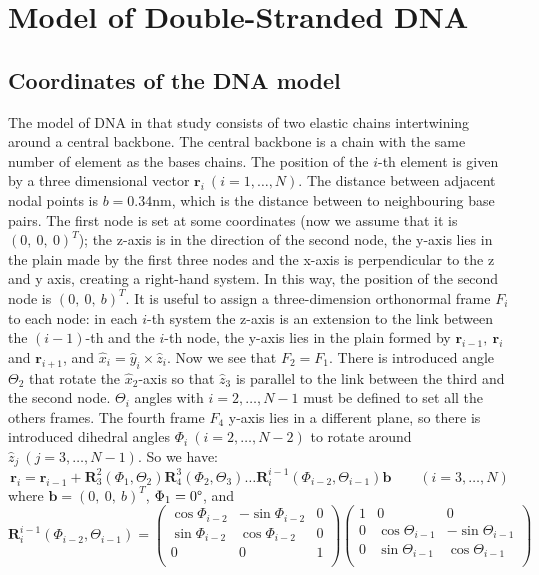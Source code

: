 \documentclass[a4paper,10pt]{article}
\begin{document}
\section{Model of Double-Stranded DNA}
\subsection{Coordinates of the DNA model}
The model of DNA in that study consists of two elastic chains intertwining around a central backbone.
The central backbone is a chain with the same number of element as the bases chains.
The position of the $i$-th element is given by a three dimensional vector $\textbf{r}_i \ \left(i=1,\dots ,N\right)$.
The distance between adjacent nodal points is $b = 0.34$\si{\nm}, which is the distance between to neighbouring base pairs.
The first node is set at some coordinates (now we assume that it is $(0,\ 0,\ 0)^T$);
the z-axis is in the direction of the second node, the y-axis lies in the plain made by the first three nodes and the x-axis is perpendicular to the z and y axis, creating a right-hand system.
In this way, the position of the second node is $(0,\ 0,\ b)^T$.
It is useful to assign a three-dimension orthonormal frame $F_i$ to each node: in each $i$-th system the z-axis is an extension to the link between the $\left (i-1\right )$-th and the $i$-th node, the y-axis lies in the plain formed by $\textbf{r}_{i-1},\ \textbf{r}_i$ and $\textbf{r}_{i+1}$, and $\hat{x}_i=\hat{y}_i\times\hat{z}_i$.
Now we see that $F_2=F_1$.
There is introduced angle $\Theta_2$ that rotate the $\hat{x}_2$-axis so that $\hat{z}_3$ is parallel to the link between the third and the second node.
$\Theta_i$ angles with $i=2,\dots,N-1$ must be defined to set all the others frames.
The fourth frame $F_4$ y-axis lies in a different plane, so there is  introduced dihedral angles $\Phi_i\ (i=2,\dots,N-2)$ to rotate around $\hat{z}_j\ (j=3,\dots,N-1)$.
So we have:
\begin{equation}\label{eq:c_coo}
\textbf{r}_i=\textbf{r}_{i-1}+\textbf{R}^{2}_{3}\left(\Phi_1,\Theta_2\right)\textbf{R}^{3}_{4}\left(\Phi_2,\Theta_3\right)\dots\textbf{R}^{i-1}_{i}\left(\Phi_{i-2},\Theta_{i-1}\right)\textbf{b}\qquad (i=3,\dots,N)
\end{equation}
where $\textbf{b}=(0,\ 0,\ b)^T$, $\Phi_1=0\degree$, and
\begin{equation}\label{eq:r_matrix}
\textbf{R}^{i-1}_{i}\left(\Phi_{i-2},\Theta_{i-1}\right)=
\begin{pmatrix}
\cos\Phi_{i-2} & -\sin\Phi_{i-2} & 0 \\
\sin\Phi_{i-2} & \cos\Phi_{i-2} & 0 \\
0 & 0 & 1 \\
\end{pmatrix}
\begin{pmatrix}
1 & 0 & 0 \\
0 & \cos\Theta_{i-1} & -\sin\Theta_{i-1} \\
0 & \sin\Theta_{i-1} & \cos\Theta_{i-1} \\
\end{pmatrix}
\end{equation}
\end{document}
